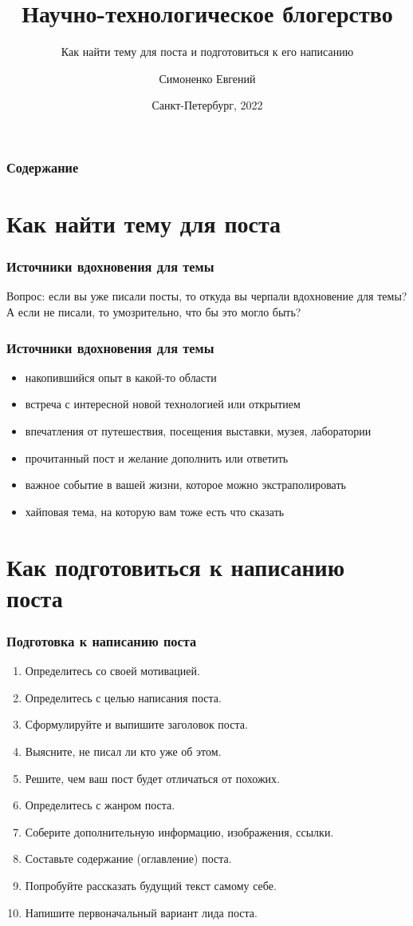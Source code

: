 \documentclass[12pt]{beamer}
\title[Блогерство]{Научно-технологическое блогерство}
\subtitle{Как найти тему для поста и подготовиться к его написанию}
\author[]{Симоненко Евгений}
\institute[]{Университет ИТМО}
\date[]{Санкт-Петербург, 2022}
\begin{document}
\begin{frame}
  \titlepage
\end{frame}

\begin{frame}
  \frametitle{Содержание}
  \tableofcontents
\end{frame}

\section{Как найти тему для поста}

\begin{frame}
  \frametitle{Источники вдохновения для темы}
  Вопрос: если вы уже писали посты, то откуда вы черпали вдохновение для темы?
  А если не писали, то умозрительно, что бы это могло быть?
\end{frame}

\begin{frame}
  \frametitle{Источники вдохновения для темы}
  \begin{itemize}
  \item накопившийся опыт в какой-то области
  \item встреча с интересной новой технологией или открытием
  \item впечатления от путешествия, посещения выставки, музея, лаборатории
  \item прочитанный пост и желание дополнить или ответить
  \item важное событие в вашей жизни, которое можно экстраполировать
  \item хайповая тема, на которую вам тоже есть что сказать
  \end{itemize}
\end{frame}

\section{Как подготовиться к написанию поста}

\begin{frame}
  \frametitle{Подготовка к написанию поста}
  \begin{enumerate}
  \item Определитесь со своей мотивацией.
  \item Определитесь с целью написания поста.
  \item Сформулируйте и выпишите заголовок поста.
  \item Выясните, не писал ли кто уже об этом.
  \item Решите, чем ваш пост будет отличаться от похожих.
  \item Определитесь с жанром поста.
  \item Соберите дополнительную информацию, изображения, ссылки.
  \item Составьте содержание (оглавление) поста.
  \item Попробуйте рассказать будущий текст самому себе.
  \item Напишите первоначальный вариант лида поста.
  \end{enumerate}
\end{frame}
\end{document}
